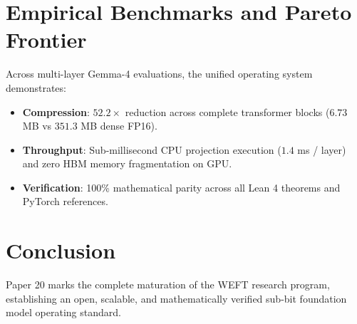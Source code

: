 \documentclass[11pt,a4paper]{article}
\begin{document}
\section{Empirical Benchmarks and Pareto Frontier}
Across multi-layer Gemma-4 evaluations, the unified operating system demonstrates:
\begin{itemize}
    \item \textbf{Compression}: $52.2\times$ reduction across complete transformer blocks ($6.73$ MB vs $351.3$ MB dense FP16).
    \item \textbf{Throughput}: Sub-millisecond CPU projection execution ($1.4$ ms / layer) and zero HBM memory fragmentation on GPU.
    \item \textbf{Verification}: 100\% mathematical parity across all Lean 4 theorems and PyTorch references.
\end{itemize}

\section{Conclusion}
Paper 20 marks the complete maturation of the WEFT research program, establishing an open, scalable, and mathematically verified sub-bit foundation model operating standard.
\end{document}
